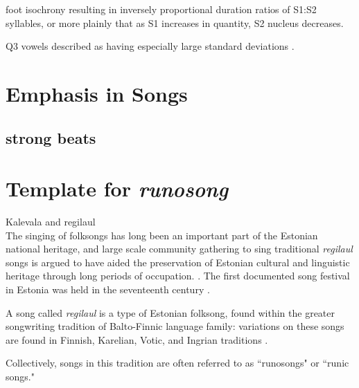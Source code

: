 foot isochrony resulting in inversely proportional duration ratios of S1:S2 syllables, or more plainly that as S1 increases in quantity, S2 nucleus decreases. \citep{eekSimplePerceptionExperiments1997}

Q3 vowels described as having especially large standard deviations \citep{eek1975}. 

\section{Emphasis in Songs}
\subsection{strong beats}

\section{Template for {\it runosong}} 
Kalevala and regilaul 
\citep{sarv1998language}\\
The singing of folksongs has long been an important part of the Estonian national heritage, and large scale community gathering to sing traditional {\it regilaul} songs is argued to have aided the preservation of Estonian cultural and linguistic heritage through long periods of occupation. \citep{bruggemannSingingOneselfNation2014}. The first documented song festival in Estonia was held in the seventeenth century \citep{ruutelTRADITIONALMUSICESTONIA2004}.


A song called {\it regilaul} is a type of Estonian folksong, found within the greater songwriting tradition of Balto-Finnic language family: variations on these songs are found in Finnish, Karelian, Votic, and Ingrian traditions \citep{tormisKalevalaEstonianPerspective1985}. 

Collectively, songs in this tradition are often referred to as ``runosongs" or ``runic songs." 

